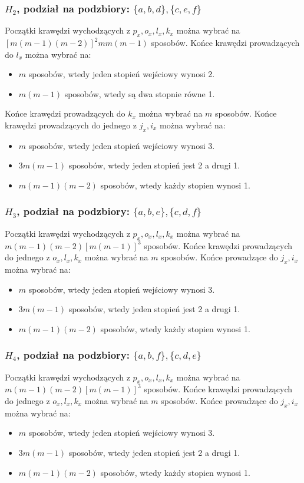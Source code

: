 \documentclass{article}
\begin{document}
\subsubsection{$H_2$, podział na podzbiory: $\{ a,b,d \}, \{ c,e,f \}$}
Początki krawędzi wychodzących z $p_x, o_x, l_x, k_x$ można wybrać na $[m(m-1)(m-2)]^2mm(m-1)$ sposobów.
Końce krawędzi prowadzących do $l_x$ można wybrać na:
\begin{itemize}
  \item $m$ sposobów, wtedy jeden stopień wejściowy wynosi 2.
  \item $m(m-1)$ sposobów, wtedy są dwa stopnie równe 1.
\end{itemize}
Końce krawędzi prowadzących do $k_x$ można wybrać na $m$ sposobów.
Końce krawędzi prowadzących do jednego z $j_x, i_x$ można wybrać na:
\begin{itemize}
  \item $m$ sposobów, wtedy jeden stopień wejściowy wynosi 3.
  \item $3m(m-1)$ sposobów, wtedy jeden stopień jest 2 a drugi 1.
  \item $m(m-1)(m-2)$ sposobów, wtedy każdy stopien wynosi 1.
\end{itemize}

\subsubsection{$H_3$, podział na podzbiory: $\{ a,b,e \}, \{ c,d,f \}$}
Początki krawędzi wychodzących z $p_x,o_x,l_x,k_x$ można wybrać na $m(m-1)(m-2)[m(m-1)]^3$ sposobów. Końce krawędzi prowadzących do jednego z $o_x, l_x, k_x$ można wybrać na $m$ sposobów. Końce prowadzące do $j_x,i_x$ można wybrać na:
\begin{itemize}
  \item $m$ sposobów, wtedy jeden stopień wejściowy wynosi 3.
  \item $3m(m-1)$ sposobów, wtedy jeden stopień jest 2 a drugi 1.
  \item $m(m-1)(m-2)$ sposobów, wtedy każdy stopien wynosi 1.
\end{itemize}


\subsubsection{$H_4$, podział na podzbiory: $\{ a,b,f \}, \{ c,d,e \}$}
Początki krawędzi wychodzących z $p_x,o_x,l_x,k_x$ można wybrać na $m(m-1)(m-2)[m(m-1)]^3$ sposobów. Końce krawędzi prowadzących do jednego z $o_x, l_x, k_x$ można wybrać na $m$ sposobów. Końce prowadzące do $j_x,i_x$ można wybrać na:
\begin{itemize}
  \item $m$ sposobów, wtedy jeden stopień wejściowy wynosi 3.
  \item $3m(m-1)$ sposobów, wtedy jeden stopień jest 2 a drugi 1.
  \item $m(m-1)(m-2)$ sposobów, wtedy każdy stopien wynosi 1.
\end{itemize}
\end{document}

